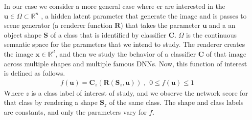     In our case we consider a more general case where er are interested in the $\mathbf{u} \in \Omega \subset \mathbb{R}^{n}$ , a hidden latent parameter that generate the image and is passes to scene generator (\eg a renderer function $\mathbf{R}$) that takes the parameter $\mathbf{u}$ and a an object shape $\mathbf{S}$ of a class that is identified by classifier $\mathbf{C}$. $\Omega$ is the continuous semantic space for the parameters that we intend to study. The renderer creates the image $\mathbf{x} \in \mathbb{R}^{d}$, and then we study the behavior of a classifier $\mathbf{C}$ of that image across multiple shapes and multiple famous DNNs. Now, this function of interest is defined as follows. 
    \begin{equation}
\begin{aligned} 
 f(\mathbf{u}) = \mathbf{C}_{z}(\mathbf{R}(\mathbf{S}_{z},\mathbf{u})) ~, ~~ 0\leq  f(\mathbf{u}) \leq 1
\label{eq:f-sup}
\end{aligned}
\end{equation}
Where $z$ is a class label of interest of study, and we observe the network score for that class by rendering a shape $\mathbf{S}_{z}$ of the same class. The shape and class labels are constants, and only the parameters vary for $f$.
